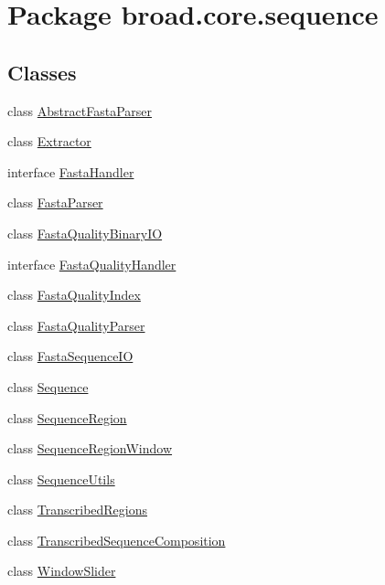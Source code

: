 \hypertarget{namespacebroad_1_1core_1_1sequence}{\section{Package broad.\+core.\+sequence}
\label{namespacebroad_1_1core_1_1sequence}
}
\subsection*{Classes}
\begin{DoxyCompactItemize}
\item 
class \hyperlink{classbroad_1_1core_1_1sequence_1_1_abstract_fasta_parser}{Abstract\+Fasta\+Parser}
\item 
class \hyperlink{classbroad_1_1core_1_1sequence_1_1_extractor}{Extractor}
\item 
interface \hyperlink{interfacebroad_1_1core_1_1sequence_1_1_fasta_handler}{Fasta\+Handler}
\item 
class \hyperlink{classbroad_1_1core_1_1sequence_1_1_fasta_parser}{Fasta\+Parser}
\item 
class \hyperlink{classbroad_1_1core_1_1sequence_1_1_fasta_quality_binary_i_o}{Fasta\+Quality\+Binary\+I\+O}
\item 
interface \hyperlink{interfacebroad_1_1core_1_1sequence_1_1_fasta_quality_handler}{Fasta\+Quality\+Handler}
\item 
class \hyperlink{classbroad_1_1core_1_1sequence_1_1_fasta_quality_index}{Fasta\+Quality\+Index}
\item 
class \hyperlink{classbroad_1_1core_1_1sequence_1_1_fasta_quality_parser}{Fasta\+Quality\+Parser}
\item 
class \hyperlink{classbroad_1_1core_1_1sequence_1_1_fasta_sequence_i_o}{Fasta\+Sequence\+I\+O}
\item 
class \hyperlink{classbroad_1_1core_1_1sequence_1_1_sequence}{Sequence}
\item 
class \hyperlink{classbroad_1_1core_1_1sequence_1_1_sequence_region}{Sequence\+Region}
\item 
class \hyperlink{classbroad_1_1core_1_1sequence_1_1_sequence_region_window}{Sequence\+Region\+Window}
\item 
class \hyperlink{classbroad_1_1core_1_1sequence_1_1_sequence_utils}{Sequence\+Utils}
\item 
class \hyperlink{classbroad_1_1core_1_1sequence_1_1_transcribed_regions}{Transcribed\+Regions}
\item 
class \hyperlink{classbroad_1_1core_1_1sequence_1_1_transcribed_sequence_composition}{Transcribed\+Sequence\+Composition}
\item 
class \hyperlink{classbroad_1_1core_1_1sequence_1_1_window_slider}{Window\+Slider}
\end{DoxyCompactItemize}
